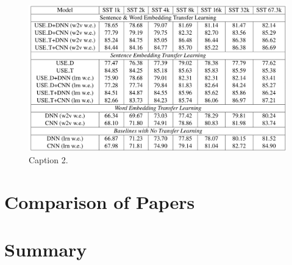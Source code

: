 \begin{figure}[h!]
\centering
  \includegraphics[width=1\linewidth]{files/use-3.png}
  \caption{Caption 2.}
  \label{fig:use-2}
\end{figure}

\newpage

\section{\label{sec:level5} Comparison of Papers}

\section{\label{sec:level6} Summary}
